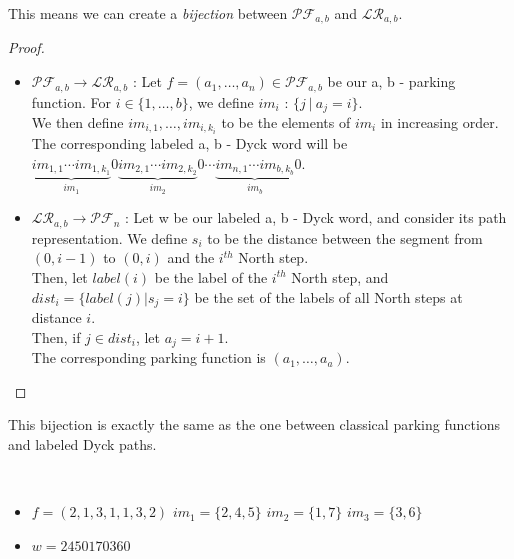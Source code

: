 \begin{prop}
    This means we can create a \emph{bijection} between
    $\mathcal{PF}_{a,b}$ and $\mathcal{LR}_{a,b}$.
\end{prop}

\begin{proof}
    ~\
    \begin{itemize}
        \item $\mathcal{PF}_{a,b} \to \mathcal{LR}_{a,b}$ :
        Let $f = (a_1, \ldots, a_n) \in \mathcal{PF}_{a,b}$
        be our a, b - parking function. For $i \in \{1, \ldots,
        b\}$, we define $im_i$ : $\{j\ |\ a_j = i\}$. \\
        We then define $im_{i,1}, \ldots, im_{i,k_i}$ to be
        the elements of $im_i$ in increasing order.\\
        The corresponding labeled a, b - Dyck word will be \\
        $\underbrace{im_{1,1} \cdots im_{1,k_1}}_{im_1}0
         \underbrace{im_{2,1} \cdots im_{2,k_2}}_{im_2}0
         \cdots
         \underbrace{im_{n,1} \cdots im_{b,k_b}}_{im_b}0$.

        \item $\mathcal{LR}_{a,b} \to \mathcal{PF}_n$ :
        Let w be our labeled a, b - Dyck word, and consider its
        path representation. We define $s_i$ to be the
        distance between the segment from $(0, i-1)$ to
        $(0,i)$ and the $i^{th}$ North step.\\
        Then, let $label(i)$ be the label of the $i^{th}$
        North step, and $dist_i = \{label(j) | s_j = i\}$
        be the set of the labels of all North steps at
        distance $i$.\\
        Then, if $j \in dist_i$, let $a_j = i + 1$.\\
        The corresponding parking function is
        $(a_1, \ldots, a_a)$.
    \end{itemize}
\end{proof}

\begin{rem}
    This bijection is exactly the same as the one between
    classical parking functions and labeled Dyck paths.
\end{rem}

\begin{example}[$a > b : a = 7, b = 3,
        \mathcal{PF}_{a,b} \to \mathcal{LR}_{a,b}$]
    ~\
    \begin{itemize}
        \item $f = (2, 1, 3, 1, 1, 3, 2)$
            \subitem $im_1 = \{2, 4, 5\}$
            \hspace{16mm} $im_2 = \{1, 7\}$
            \hspace{24mm} $im_3 = \{3, 6\}$
        \item $w = 2450170360$
    \end{itemize}
    
\end{example}

